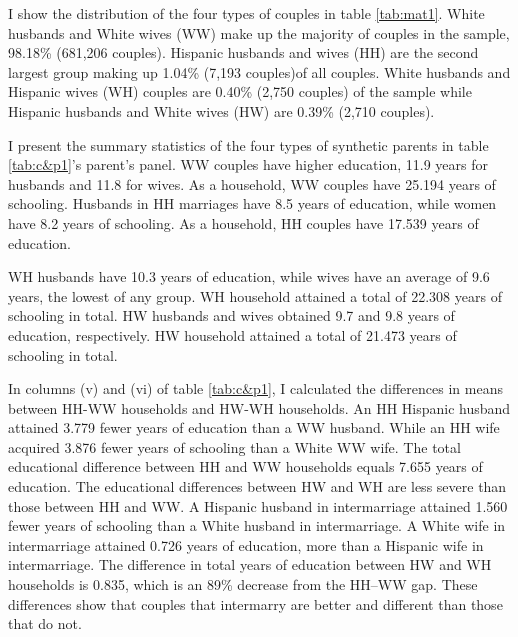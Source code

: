 \documentclass[12pt, fullpage]{article}
\begin{document}
I show the distribution of the four types of couples in table \ref{tab:mat1}. White husbands and White wives (WW) make up the majority of couples in the sample, 98.18\% (681,206 couples). Hispanic husbands and wives (HH) are the second largest group making up 1.04\% (7,193 couples)of all couples. White husbands and Hispanic wives (WH) couples are 0.40\% (2,750 couples) of the sample while Hispanic husbands and White wives (HW) are 0.39\% (2,710 couples). 



I present the summary statistics of the four types of synthetic parents in table \ref{tab:c&p1}'s parent's panel. WW couples have higher education, 11.9 years for husbands and 11.8 for wives. As a household, WW couples have 25.194 years of schooling. Husbands in HH marriages have 8.5 years of education, while women have 8.2 years of schooling. As a household, HH couples have 17.539 years of education.

WH husbands have 10.3 years of education, while wives have an average of 9.6 years, the lowest of any group. WH household attained a total of 22.308 years of schooling in total. HW husbands and wives obtained 9.7 and 9.8 years of education, respectively. HW household attained a total of 21.473 years of schooling in total.

In columns (v) and (vi) of table \ref{tab:c&p1}, I calculated the differences in means between HH-WW households and HW-WH households. An HH Hispanic husband attained 3.779 fewer years of education than a WW husband. While an HH wife acquired 3.876 fewer years of schooling than a White WW wife. The total educational difference between HH and WW households equals 7.655 years of education. The educational differences between HW and WH are less severe than those between HH and WW. A Hispanic husband in intermarriage attained 1.560 fewer years of schooling than a White husband in intermarriage. A White wife in intermarriage attained 0.726 years of education, more than a Hispanic wife in intermarriage. The difference in total years of education between HW and WH households is 0.835, which is an 89\% decrease from the HH--WW gap. These differences show that couples that intermarry are better and different than those that do not.



\end{document}
